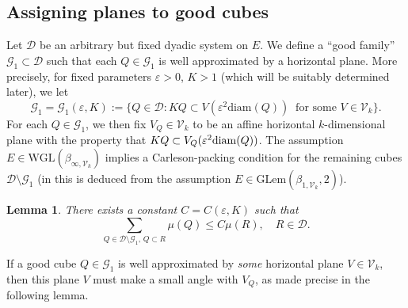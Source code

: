 \documentclass[12pt]{amsart}
\newcommand{\diam}{{\rm diam}}
\numberwithin{equation}{section}
\theoremstyle{plain}
\newtheorem{lemma}[theorem]{Lemma}
\theoremstyle{definition}
\theoremstyle{remark}
\begin{document}
\subsection{Assigning planes to good cubes}
\label{ss:CoronaStep1}

Let $\mathcal{D}$ be an arbitrary but fixed dyadic system on $E$. We define a ``good family'' $\mathcal{G}_1\subset \mathcal{D}$ such that each 
$Q\in \mathcal{G}_1$ is well approximated by a horizontal plane. More precisely, for fixed parameters $\varepsilon>0$, $K>1$ (which will be suitably determined later), we let
\[\mathcal G_1=\mathcal G_1(\varepsilon, K):=\{Q\in\mathcal D: KQ\subset V(\varepsilon^2\mathrm{diam}(Q))\;\;\text{for some }V\in\mathcal V_k\}.\]
For each $Q\in\mathcal G_1$, we then fix $V_Q\in\mathcal V_k$ to be an affine horizontal $k$-dimensional plane with the property that $KQ\subset V_Q(\varepsilon^2\diam(Q))$.
The assumption $E\in \mathrm{WGL}(\beta_{\infty,\mathcal{V}_k})$ implies a Carleson-packing condition for the remaining cubes $\mathcal{D}\setminus \mathcal{G}_1$ (in 
\cite[p.5]{Hahlomaa} this is deduced from the assumption $E\in \mathrm{GLem}(\beta_{1,\mathcal{V}_k},2)$). 
\begin{lemma}
    There exists a constant $C=C(\varepsilon, K)$ such that
    \begin{equation}\label{eq_carlesoncondition}\sum_{Q\in \mathcal D\setminus \mathcal G_1,\, Q\subset R}\mu(Q)\leq C\mu(R),\quad R\in\mathcal D.\end{equation}
\end{lemma}

If 
a good cube $Q\in \mathcal{G}_1$ is well approximated by \emph{some} horizontal plane $V\in \mathcal{V}_k$,
then this plane $V$ must make a small angle with $V_Q$, as made precise in the following lemma.
\end{document}

